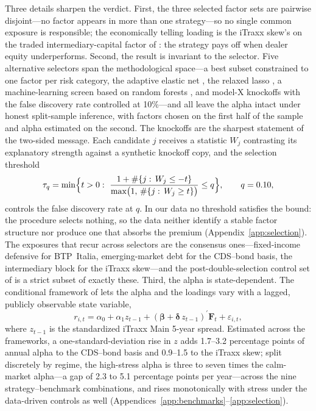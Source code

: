 Three details sharpen the verdict. First, the three selected factor sets are
pairwise disjoint---no factor appears in more than one strategy---so no single
common exposure is responsible; the economically telling loading is the iTraxx
skew's on the traded intermediary-capital factor of \citet{he2017intermediary}:
the strategy pays off when dealer equity underperforms. Second, the result is
invariant to the selector. Five alternative selectors span the methodological
space---a best subset constrained to one factor per risk category, the
adaptive elastic net \citep{zou2009adaptive}, the relaxed lasso
\citep{meinshausen2007relaxed}, a machine-learning screen based on random
forests \citep{breiman2001random},
and model-X knockoffs \citep{candes2018panning} with the false discovery rate
controlled at 10\%---and all leave the alpha intact under honest split-sample
inference, with factors chosen on the first half of the sample and alpha
estimated on the second. The knockoffs are the sharpest statement of the
two-sided message. Each candidate $j$ receives a statistic $W_j$ contrasting
its explanatory strength against a synthetic knockoff copy, and the selection
threshold
\begin{equation}
\tau_q=\min\Bigl\{t>0:\
\frac{1+\#\{j:\,W_j\le -t\}}{\max\bigl(1,\,\#\{j:\,W_j\ge t\}\bigr)}\le q
\Bigr\},\qquad q=0.10,
\end{equation}
controls the false discovery rate at $q$. In our data no threshold satisfies
the bound: the procedure selects nothing, so the data neither identify a
stable factor structure nor produce one that absorbs the premium
(Appendix~\ref{app:selection}). The exposures that recur across selectors are
the consensus ones---fixed-income defensive for BTP~Italia, emerging-market
debt for the CDS--bond basis, the intermediary block for the iTraxx skew---and
the post-double-selection control set of \citet{belloni2014inference} is a
strict subset of exactly these. Third, the alpha is state-dependent. The conditional framework of
\citet{christopherson1998conditioning} lets the alpha and the loadings vary
with a lagged, publicly observable state variable,
\begin{equation}
r_{i,t} = \alpha_0 + \alpha_1 z_{t-1}
        + (\boldsymbol\beta + \boldsymbol\delta\, z_{t-1})^{\prime}\mathbf{F}_t
        + \varepsilon_{i,t},
\end{equation}
where $z_{t-1}$ is the standardized iTraxx Main 5-year spread. Estimated
across the frameworks, a one-standard-deviation rise in $z$ adds 1.7--3.2
percentage points of annual alpha to the CDS--bond basis and 0.9--1.5 to the
iTraxx skew; split discretely by regime, the high-stress alpha is three to
seven times the calm-market alpha---a gap of 2.3 to 5.1 percentage points per
year---across the nine strategy--benchmark
combinations, and rises monotonically with stress under the data-driven
controls as well (Appendices~\ref{app:benchmarks}--\ref{app:selection}).

